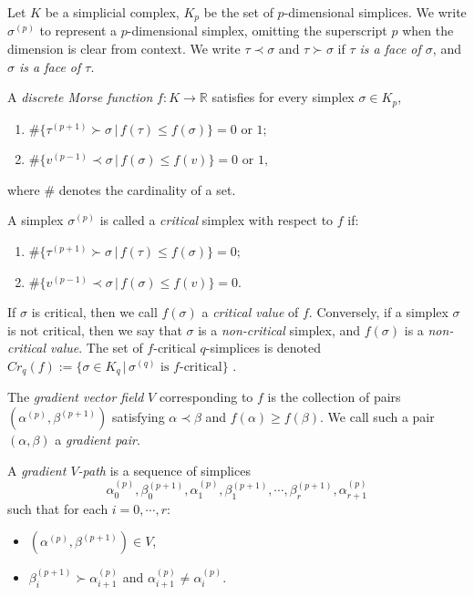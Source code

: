 \documentclass[a4paper,12pt,notitlepage]{amsart}
\theoremstyle{definition}%
\theoremstyle{definition}%
\theoremstyle{definition}%
\begin{document}
Let $K$ be a simplicial complex,
$K_p$ be the set of $p$-dimensional simplices.
We write $\sigma^{(p)}$ to represent a 
$p$-dimensional simplex,
omitting the superscript
$p$
when the dimension is clear from context.
We write $\tau \prec \sigma$  and  $\tau  \succ  \sigma$ if 
\textit{$\tau $ is a face of $\sigma$}, and \textit{$\sigma$ is a face of $\tau $}.

A \textit{discrete Morse function}
$f:K \to \mathbb{R}$
satisfies for every simplex
$\sigma \in K_p$,
\begin{enumerate}
\item $\displaystyle \# \{\tau^{(p+1)} \succ \sigma \, | \, f(\tau) \leq f(\sigma)\} = 0 \text{ or } 1;$
\item 
$\displaystyle  \# \{v^{(p-1)} \prec \sigma \, | \, f(\sigma) \leq f(v)\} =0 \text{ or } 1,$
\end{enumerate}
where $\#$ denotes the cardinality of a set.

A simplex
$\sigma^{(p)}$ is called a
\textit{critical}  simplex with respect to $f$
if:
\begin{enumerate}
\item 
$\displaystyle\# \{\tau^{(p+1)} \succ \sigma \, | \, f(\tau) \leq f(\sigma)\} =0;$
\item 
$\displaystyle\# \{v^{(p-1)} \prec \sigma \, | \, f(\sigma) \leq f(v)\} =0.$
\end{enumerate}
If $\sigma$ is  critical,
then we call $f(\sigma)$ a \textit{critical value} of $f$.
Conversely, if a simplex $\sigma$ is not critical, 
then
we say that $\sigma$ is a \textit{non-critical} simplex,
and $f(\sigma)$ is a \textit{non-critical value}.
The set of $f$-critical $q$-simplices is denoted
$Cr_q(f):= \{ \sigma \in K_q \, | \, \sigma^{(q)} \text{ is } f \text{-critical}  
  \}$  .


The  \textit{gradient vector field} $V$ corresponding to $f$ is 
the collection of pairs 
$(\alpha^{(p)}, \beta^{(p+1)})$
satisfying 
$\alpha \prec \beta$ and
$f(\alpha) \geq f(\beta)$.
We call such a pair $(\alpha, \beta)$
a \textit{gradient pair}.

A  \textit{gradient $V$-path} is a sequence 
of simplices
$$\alpha_0^{(p)}, \beta_0^{(p+1)}, \alpha_1^{(p)}, \beta_1^{(p+1)},\cdots, \beta_r^{(p+1)}, \alpha_{r+1}^{(p)} $$
such that for
each $i= 0, \cdots,r $:
\begin{itemize}
\item $(\alpha^{(p)}, \beta^{(p+1)})\in V$,
\item $\beta_i^{(p+1)} \succ \alpha_{i+1}^{(p)}$ and $\alpha_{i+1}^{(p)} \neq \alpha_i^{(p)}.$
\end{itemize}
\end{document}
